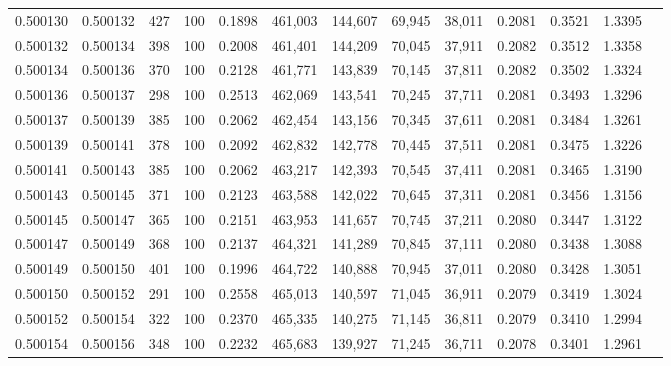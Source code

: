 \begin{tabular}{rrrrrrrrrrrrr}
0.500130 & 0.500132 &   427 & 100 &                                     0.1898 & 461,003 & 144,607 &  69,945 &  38,011 & 0.2081 & 0.3521 & 1.3395 \\
0.500132 & 0.500134 &   398 & 100 &                                     0.2008 & 461,401 & 144,209 &  70,045 &  37,911 & 0.2082 & 0.3512 & 1.3358 \\
0.500134 & 0.500136 &   370 & 100 &                                     0.2128 & 461,771 & 143,839 &  70,145 &  37,811 & 0.2082 & 0.3502 & 1.3324 \\
0.500136 & 0.500137 &   298 & 100 &                                     0.2513 & 462,069 & 143,541 &  70,245 &  37,711 & 0.2081 & 0.3493 & 1.3296 \\
0.500137 & 0.500139 &   385 & 100 &                                     0.2062 & 462,454 & 143,156 &  70,345 &  37,611 & 0.2081 & 0.3484 & 1.3261 \\
0.500139 & 0.500141 &   378 & 100 &                                     0.2092 & 462,832 & 142,778 &  70,445 &  37,511 & 0.2081 & 0.3475 & 1.3226 \\
0.500141 & 0.500143 &   385 & 100 &                                     0.2062 & 463,217 & 142,393 &  70,545 &  37,411 & 0.2081 & 0.3465 & 1.3190 \\
0.500143 & 0.500145 &   371 & 100 &                                     0.2123 & 463,588 & 142,022 &  70,645 &  37,311 & 0.2081 & 0.3456 & 1.3156 \\
0.500145 & 0.500147 &   365 & 100 &                                     0.2151 & 463,953 & 141,657 &  70,745 &  37,211 & 0.2080 & 0.3447 & 1.3122 \\
0.500147 & 0.500149 &   368 & 100 &                                     0.2137 & 464,321 & 141,289 &  70,845 &  37,111 & 0.2080 & 0.3438 & 1.3088 \\
0.500149 & 0.500150 &   401 & 100 &                                     0.1996 & 464,722 & 140,888 &  70,945 &  37,011 & 0.2080 & 0.3428 & 1.3051 \\
0.500150 & 0.500152 &   291 & 100 &                                     0.2558 & 465,013 & 140,597 &  71,045 &  36,911 & 0.2079 & 0.3419 & 1.3024 \\
0.500152 & 0.500154 &   322 & 100 &                                     0.2370 & 465,335 & 140,275 &  71,145 &  36,811 & 0.2079 & 0.3410 & 1.2994 \\
0.500154 & 0.500156 &   348 & 100 &                                     0.2232 & 465,683 & 139,927 &  71,245 &  36,711 & 0.2078 & 0.3401 & 1.2961 \\

\end{tabular}
